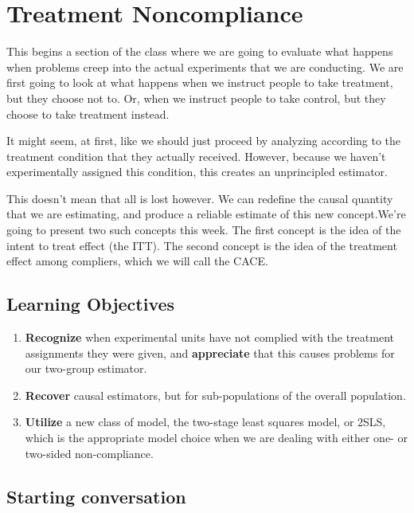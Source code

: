 \documentclass[
]{article}
\providecommand{\tightlist}{%
  \setlength{\itemsep}{0pt}\setlength{\parskip}{0pt}}
\begin{document}
\hypertarget{treatment-noncompliance}{%
\section{Treatment Noncompliance}\label{treatment-noncompliance}}

This begins a section of the class where we are going to evaluate what happens when problems creep into the actual experiments that we are conducting. We are first going to look at what happens when we instruct people to take treatment, but they choose not to. Or, when we instruct people to take control, but they choose to take treatment instead.

It might seem, at first, like we should just proceed by analyzing according to the treatment condition that they actually received. However, because we haven't experimentally assigned this condition, this creates an unprincipled estimator.

This doesn't mean that all is lost however. We can redefine the causal quantity that we are estimating, and produce a reliable estimate of this new concept.We're going to present two such concepts this week. The first concept is the idea of the intent to treat effect (the ITT). The second concept is the idea of the treatment effect among compliers, which we will call the CACE.

\hypertarget{learning-objectives-7}{%
\subsection{Learning Objectives}\label{learning-objectives-7}}

\begin{enumerate}
\def\labelenumi{\arabic{enumi}.}
\tightlist
\item
  \textbf{Recognize} when experimental units have not complied with the treatment assignments they were given, and \textbf{appreciate} that this causes problems for our two-group estimator.
\item
  \textbf{Recover} causal estimators, but for sub-populations of the overall population.
\item
  \textbf{Utilize} a new class of model, the two-stage least squares model, or 2SLS, which is the appropriate model choice when we are dealing with either one- or two-sided non-compliance.
\end{enumerate}

\hypertarget{starting-conversation}{%
\subsection{Starting conversation}\label{starting-conversation}}
\end{document}
